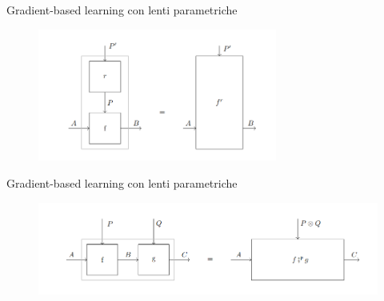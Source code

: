 \documentclass{beamer}
\begin{document}
\begin{frame}{Gradient-based learning con lenti parametriche}
    \begin{figure}
        \begin{center}
            \includegraphics[width=0.7\textwidth]{figures/para_reparametrization.png}
            \caption*{\cite{gavranovic2024fundamental}}
        \end{center}
    \end{figure}
\end{frame}

\begin{frame}{Gradient-based learning con lenti parametriche}
    \begin{figure}
        \begin{center}
            \includegraphics[width=\textwidth]{figures/para_composition.png}
            \caption*{\cite{gavranovic2024fundamental}}
        \end{center}
    \end{figure}
\end{frame}
\end{document}
